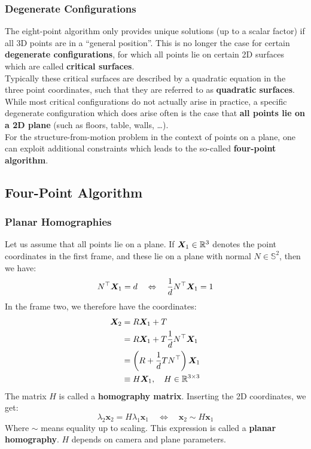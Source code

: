 \subsubsection*{Degenerate Configurations}%
\label{ssub:degenerate_configurations}

The eight-point algorithm only provides unique solutions (up to a scalar factor)
if all 3D points are in a ``general position''.
This is no longer the case for certain \textbf{degenerate configurations},
for which all points lie on certain 2D surfaces which are called
\textbf{critical surfaces}.\\

Typically these critical surfaces are described by a quadratic equation
in the three point coordinates, such that they are referred to as
\textbf{quadratic surfaces}.\\

While most critical configurations do not actually arise in practice,
a specific degenerate configuration which does arise often is the case that
\textbf{all points lie on a 2D plane} (such as floors, table, walls, \ldots).\\

For the structure-from-motion problem in the context of points on a plane,
one can exploit additional constraints which leads to the so-called
\textbf{four-point algorithm}.


\subsection{Four-Point Algorithm}%
\label{sub:four_point_algorithm}


\subsubsection*{Planar Homographies}%
\label{ssub:planar_homographies}


Let us assume that all points lie on a plane. If $\bm{X}_1 \in \mathbb{R}^3$
denotes the point coordinates in the first frame, and these lie on a plane
with normal $N \in \mathbb{S}^2$, then we have:
\[
	N^{\top} \bm{X}_1 = d \quad \Leftrightarrow \quad
	\frac{1}{d} N^{\top} \bm{X}_1 = 1
\]
In the frame two, we therefore have the coordinates:
\begin{align*}
	\bm{X}_2
		&= R \bm{X}_1 + T \\
		&= R \bm{X}_1 + T \frac{1}{d} N^{\top} \bm{X}_1 \\
		&= \left( R + \frac{1}{d} T N^{\top} \right) \bm{X}_1 \\
		&\equiv H \bm{X}_1, \quad H \in \mathbb{R}^{3 \times{} 3}
\end{align*}
The matrix $H$ is called a \textbf{homography matrix}.
Inserting the 2D coordinates, we get:
\[
	\lambda_2 \bm{x}_2 = H \lambda_1 \bm{x}_1 \quad \Leftrightarrow \quad
	\boxed{ \bm{x}_2 \sim H \bm{x}_1 }
\]
Where $\sim$ means equality up to scaling.
This expression is called a \textbf{planar homography}.
$H$ depends on camera and plane parameters.


